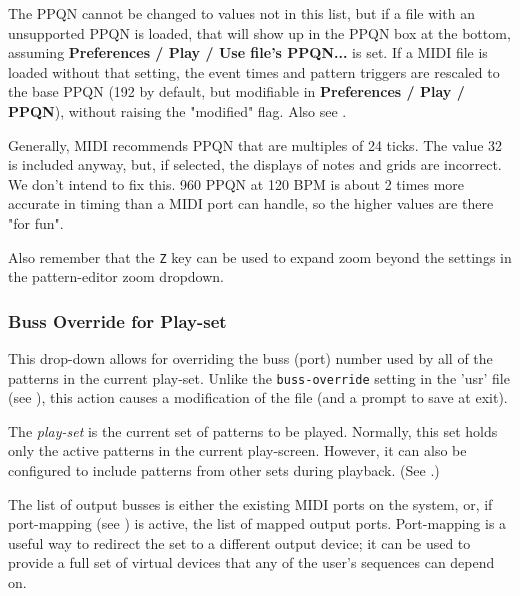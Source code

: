    The PPQN cannot be changed to values not in this list, but
   if a file with an unsupported PPQN is loaded, that will show up
   in the PPQN box at the bottom, assuming
   \textbf{Preferences / Play / Use file's PPQN...} is set.
   If a MIDI file is loaded without that setting, the event times
   and pattern triggers are
   rescaled to the base PPQN (192 by default, but modifiable in 
   \textbf{Preferences / Play / PPQN}), without
   raising the "modified" flag.
   Also see .

   Generally, MIDI recommends PPQN that are multiples of 24 ticks.
   The value 32 is included anyway, but, if selected, the
   displays of notes and grids are incorrect.
   We don't intend to fix this.
   960 PPQN at 120 BPM is about 2 times more accurate in timing
   than a MIDI port can handle, so the higher values are there
   "for fun".

   Also remember that the \texttt{Z} key can be used to expand zoom
   beyond the settings in the pattern-editor zoom dropdown.

\subsubsection{Buss Override for Play-set}
\label{subsubsec:introduction_sets_buss_override}

   This drop-down allows for overriding the buss (port) number used by all of
   the patterns in the current play-set.
   Unlike the \texttt{buss-override} setting in the 'usr' file
   (see ),
   this action causes a modification of the file (and a prompt to save at
   exit).

   The \textsl{play-set} is the current set of patterns to be played.
   Normally, this set holds only the active patterns in the current
   play-screen.
   However, it can also be configured to include patterns from other sets
   during playback.
   (See .)

   The list of
   output busses is either the existing MIDI ports on the system, or,
   if port-mapping (see ) is active, the list
   of mapped output ports.
   Port-mapping is a useful way to redirect the set to a different output
   device; it can be used to provide a full set of virtual devices that any of
   the user's sequences can depend on.

